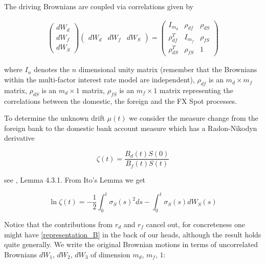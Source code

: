 \documentclass{amsart}
\theoremstyle{plain}
\numberwithin{equation}{section}
\begin{document}
The driving Brownians are coupled via correlations given by

\begin{eqnarray}
  \begin{pmatrix} 
    dW_d \\
    dW_f \\
    dW_S
  \end{pmatrix} \begin{pmatrix}
    dW_d & dW_f & dW_S
  \end{pmatrix} = \begin{pmatrix}
    I_{m_d}      &   \rho_{df}  & \rho_{dS} \\
    \rho_{df}^T  & I_{m_f}      & \rho_{fS} \\
    \rho_{dS}^T  &  \rho_{fS}   & 1
    \end{pmatrix}
\end{eqnarray}

where $I_n$ denotes the $n$ dimensional unity matrix (remember that the Brownians within the multi-factor interest rate
model are independent), $\rho_{df}$ is an $m_d \times m_f$ matrix, $\rho_{dS}$ is an $m_d \times 1$ matrix, $\rho_{fS}$
is an $m_f \times 1 $ matrix representing the correlations between the domestic, the foreign and the FX Spot processes.

To determine the unknown drift $\mu(t)$ we consider the measure change from the foreign bank to the domestic bank
account measure which has a Radon-Nikodyn derivative

\begin{equation}
  \zeta(t) = \frac{B_d(t) S(0)}{B_f(t) S(t)}
\end{equation}


see \cite{Andersen_Piterbarg_2010}, Lemma 4.3.1. From Ito's Lemma we get

\begin{equation}
\ln \zeta(t) = -\frac{1}{2} \int_0^t \sigma_S(s)^2 ds - \int_0^t{\sigma_S(s) dW_S(s)}
\end{equation}

Notice that the contributions from $r_d$ and $r_f$ cancel out, for concreteness one might have \ref{representation_B} in
the back of our heads, although the result holds quite generally. We write the original Brownian motions in terms of
uncorrelated Brownians $dW_1$, $dW_2$, $dW_3$ of dimension $m_d$, $m_f$, $1$:
\end{document}
